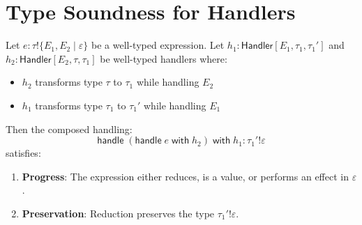 \section{Type Soundness for Handlers}
\label{sec:handler-type-soundness}

\begin{theorem}
\label{thm:handler-composition-sound}
Let $e : \tau \mathbin{!} \{E_1, E_2 \mid \varepsilon\}$ be a well-typed expression. Let $h_1 : \mathsf{Handler}[E_1, \tau_1, \tau_1']$ and $h_2 : \mathsf{Handler}[E_2, \tau, \tau_1]$ be well-typed handlers where:
\begin{itemize}
  \item $h_2$ transforms type $\tau$ to $\tau_1$ while handling $E_2$
  \item $h_1$ transforms type $\tau_1$ to $\tau_1'$ while handling $E_1$
\end{itemize}
Then the composed handling:
\[
\mathsf{handle}\; (\mathsf{handle}\; e\; \mathsf{with}\; h_2)\; \mathsf{with}\; h_1 : \tau_1' \mathbin{!} \varepsilon
\]
satisfies:
\begin{enumerate}
  \item \textbf{Progress}: The expression either reduces, is a value, or performs an effect in $\varepsilon$.
  \item \textbf{Preservation}: Reduction preserves the type $\tau_1' \mathbin{!} \varepsilon$.
\end{enumerate}
\end{theorem}

